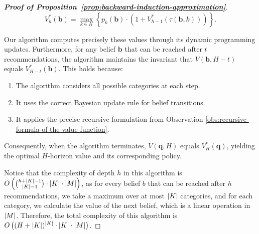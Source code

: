 \begin{proof}[\normalfont\bfseries Proof of Proposition~\ref{prop:backward-induction-approximation}]
  \[
    V^*_h(\bm{b}) = \max_{k \in K} \left\{ p_k(\bm{b}) \cdot (1 + V^*_{h-1}(\tau(\bm{b}, k))) \right\}.
  \]

  Our algorithm computes precisely these values through its dynamic programming updates. Furthermore, for any belief $\bm{b}$ that can be reached after $t$ recommendations, the algorithm maintains the invariant that $V(\bm{b}, H-t)$ equals $V^*_{H-t}(\bm{b})$. This holds because:
  \begin{enumerate}
    \item The algorithm considers all possible categories at each step.
    \item It uses the correct Bayesian update rule for belief transitions.
    \item It applies the precise recursive formulation from Observation \ref{obs:recursive-formula-of-the-value-function}.
  \end{enumerate}

  Consequently, when the algorithm terminates, $V(\bm{q}, H)$ equals $V^*_H(\bm{q})$, yielding the optimal $H$-horizon value and its corresponding policy.

  Notice that the complexity of depth $h$ in this algorithm is $O\left( { h + \lvert K\rvert - 1 \choose \lvert K\rvert - 1} \cdot \lvert K\rvert \cdot \lvert M\rvert \right)$, as for every belief $b$ that can be reached after $h$ recommendations, we take a maximum over at most $\lvert K\rvert$ categories, and for each category, we calculate the value of the next belief, which is a linear operation in $\lvert M\rvert$.
  Therefore, the total complexity of this algorithm is $O\left( (H + \lvert K\rvert)^{\lvert K\rvert} \cdot \lvert K\rvert \cdot \lvert M\rvert \right)$.
\end{proof}




